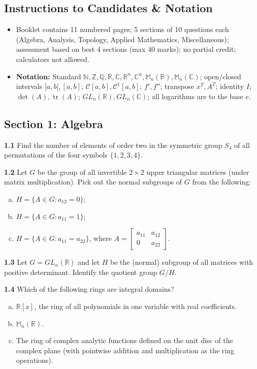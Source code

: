 \documentclass[11pt,a4paper]{article}
\newcommand{\N}{\mathbb{N}}
\newcommand{\Z}{\mathbb{Z}}
\newcommand{\Q}{\mathbb{Q}}
\newcommand{\R}{\mathbb{R}}
\newcommand{\C}{\mathbb{C}}
\newcommand{\M}{\mathbb{M}}
\newcommand{\tr}{\operatorname{tr}}
\newcommand{\examsec}[1]{%
  \subsection*{#1}
  \vspace{-2pt}
}
\newcommand{\qitem}[1]{\par\medskip\noindent\textbf{#1}\hspace{0.5em}}
\begin{document}
\subsection*{Instructions to Candidates \& Notation}
\begin{itemize}
  \item Booklet contains 11 numbered pages; 5 sections of 10 questions each (Algebra, Analysis, Topology, Applied Mathematics, Miscellaneous); assessment based on best 4 sections (max 40 marks); no partial credit; calculators not allowed.
  \item \textbf{Notation:} Standard $\N, \Z, \Q, \R, \C, \R^n, \C^n, \M_n(\R), \M_n(\C)$; open/closed intervals $]a, b[, [a, b]$; $\mathcal{C}[a, b], \mathcal{C}^1[a, b]$; $f', f''$; transpose $x^T, A^T$; identity $I$; $\det(A), \tr(A)$; $GL_n(\R), GL_n(\C)$; all logarithms are to the base $e$.
\end{itemize}

\examsec{Section 1: Algebra}

\qitem{1.1} Find the number of elements of order two in the symmetric group $S_4$ of all permutations of the four symbols $\{1, 2, 3, 4\}$.

\qitem{1.2} Let $G$ be the group of all invertible $2 \times 2$ upper triangular matrices (under matrix multiplication). Pick out the normal subgroups of $G$ from the following:
\begin{enumerate}[a.]
  \item $H = \{A \in G : a_{12} = 0\}$;
  \item $H = \{A \in G : a_{11} = 1\}$;
  \item $H = \{A \in G : a_{11} = a_{22}\}$, where $A = \begin{bmatrix} a_{11} & a_{12} \\ 0 & a_{22} \end{bmatrix}$.
\end{enumerate}

\qitem{1.3} Let $G = GL_n(\R)$ and let $H$ be the (normal) subgroup of all matrices with positive determinant. Identify the quotient group $G/H$.

\qitem{1.4} Which of the following rings are integral domains?
\begin{enumerate}[a.]
  \item $\R[x]$, the ring of all polynomials in one variable with real coefficients.
  \item $\M_n(\R)$.
  \item The ring of complex analytic functions defined on the unit disc of the complex plane (with pointwise addition and multiplication as the ring operations).
\end{enumerate}
\end{document}
